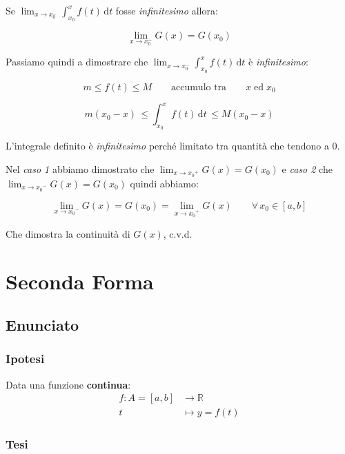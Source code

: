 \documentclass[../dimostrazioni]{subfiles}
\begin{document}
                    Se \( \lim_{x \to x_0^-} \int_{x_0}^x \! f(t) \, \mathrm{d}t \) fosse \emph{infinitesimo} allora:

                    \[  \lim_{x \to x_0^-}G(x) = G(x_0) \]

                    Passiamo quindi a dimostrare che \( \lim_{x \to x_0^-} \int_{x_0}^x \! f(t) \, \mathrm{d}t \) è \emph{infinitesimo}:

                    \[m \leqslant f(t) \leqslant M \qquad \text {accumulo tra} \qquad x \; \text{ed} \; x_0 \]

                    \[m(x_0-x) \, \leqslant \int_{x_0}^x \! f(t) \, \mathrm{d}t \, \leqslant M(x_0-x) \]

                    L'integrale definito è \emph{infinitesimo} perché limitato tra quantità che tendono a 0.

                Nel \textit{caso 1} abbiamo dimostrato che \(  \lim_{x \to {x_0}^{+}}G(x) = G(x_0) \) e \textit{caso 2} che \(  \lim_{x \to {x_0}^{-}}G(x) = G(x_0) \) quindi abbiamo:

                \[  \lim_{x \to {x_0}^{-}}G(x) = G(x_0) = \lim_{x \to {x_0}^{+}}G(x) \qquad \forall \, x_0 \in [a, b] \]

                Che dimostra la continuità di \(G(x)\), c.v.d.
            
            \section*{Seconda Forma}

                \subsection*{Enunciato}

                    \subsubsection*{Ipotesi}

                        Data una funzione \textbf{continua}:
                        \begin{align*}
                            f : A = [a, b] &\longrightarrow \mathbb{R}\\
                            t &\longmapsto y = f(t) 
                        \end{align*}

                    \subsubsection*{Tesi}
                    
\end{document}
